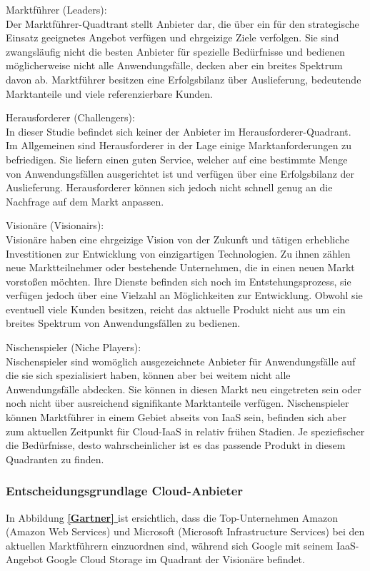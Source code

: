 \documentclass[13pt,a4paper,bibliography=totocnumbered,listof=totocnumbered]{scrartcl}
\newcommand*{\fullref}[1]{\textbf{\hyperref[{#1}]{\ref*{#1} \nameref*{#1}}}}
\begin{document}
\begin{compactitem}
\item{Marktführer (Leaders):}
\\Der Marktführer-Quadtrant stellt Anbieter dar, die über ein für den strategische Einsatz geeignetes Angebot verfügen und ehrgeizige Ziele verfolgen. Sie sind zwangsläufig nicht die besten Anbieter für spezielle Bedürfnisse und bedienen möglicherweise nicht alle Anwendungsfälle, decken aber ein breites Spektrum davon ab. Marktführer besitzen eine Erfolgsbilanz über Auslieferung, bedeutende Marktanteile und viele referenzierbare Kunden.
\item{Herausforderer (Challengers):}
\\In dieser Studie befindet sich keiner der Anbieter im Herausforderer-Quadrant. Im Allgemeinen sind Herausforderer in der Lage einige Marktanforderungen zu befriedigen. Sie liefern einen guten Service, welcher auf eine bestimmte Menge von Anwendungsfällen ausgerichtet ist und verfügen über eine Erfolgsbilanz der Auslieferung. Herausforderer können sich jedoch nicht schnell genug an die Nachfrage auf dem Markt anpassen.
\item{Visionäre (Visionairs):}
\\Visionäre haben eine ehrgeizige Vision von der Zukunft und tätigen erhebliche Investitionen zur Entwicklung von einzigartigen Technologien. Zu ihnen zählen neue Marktteilnehmer oder bestehende Unternehmen, die in einen neuen Markt vorstoßen möchten. Ihre Dienste befinden sich noch im Entstehungsprozess, sie verfügen jedoch über eine Vielzahl an Möglichkeiten zur Entwicklung. Obwohl sie eventuell viele Kunden besitzen, reicht das aktuelle Produkt nicht aus um ein breites Spektrum von Anwendungsfällen zu bedienen.
\item{Nischenspieler (Niche Players):}
\\Nischenspieler sind womöglich ausgezeichnete Anbieter für Anwendungsfälle auf die sie sich spezialisiert haben, können aber bei weitem nicht alle Anwendungsfälle abdecken. Sie können in diesen Markt neu eingetreten sein oder noch nicht über ausreichend signifikante Marktanteile verfügen. Nischenspieler können Marktführer in einem Gebiet abseits von IaaS sein, befinden sich aber zum aktuellen Zeitpunkt für Cloud-IaaS in relativ frühen Stadien. Je speziefischer die Bedürfnisse, desto wahrscheinlicher ist es das passende Produkt in diesem Quadranten zu finden.
\end{compactitem}
\cite{30}

\subsubsection{Entscheidungsgrundlage Cloud-Anbieter}
In Abbildung \fullref{Gartner} ist ersichtlich, dass die Top-Unternehmen Amazon (Amazon Web Services) und Microsoft (Microsoft Infrastructure Services) bei den aktuellen Marktführern einzuordnen sind, während sich Google mit seinem IaaS-Angebot Google Cloud Storage im Quadrant der Visionäre befindet.
\end{document}
